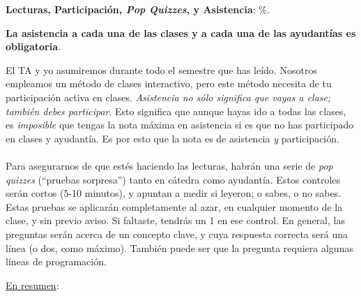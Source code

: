 \documentclass[letterpaper]{article}
\renewenvironment{itemize}{
  \begin{list}{}{
    \setlength{\leftmargin}{1.5em}
  }
}{
  \end{list}
}
\begin{document}
\begin{enumerate}

	\item {\bf Lecturas, Participaci\'on, \emph{Pop Quizzes}, y Asistencia}: {\unskip}\%.
	
	
	\begin{itemize}
		\item[\Pointinghand] {\bf La asistencia a cada una de las clases y a cada una de las ayudant\'ias es obligatoria}.
	\end{itemize}

	El TA y yo asumiremos durante todo el semestre que has le\'ido. Nosotros empleamos un m\'etodo de clases interactivo, pero este m\'etodo necesita de tu participaci\'on activa en clases. \emph{Asistencia no s\'olo significa que vayas a clase; tambi\'en debes participar}. Esto significa que aunque hayas ido a todas las clases, es \emph{imposible} que tengas la nota m\'axima en asistencia si es que no has participado en clases y ayudant\'ia. Es por esto que la nota es de asistencia \emph{y} participaci\'on.
\\
\\	
	Para asegurarnos de que est\'es haciendo las lecturas, habr\'an una serie de \emph{pop quizzes} (``pruebas sorpresa'') tanto en c\'atedra como ayudant\'ia. Estos controles ser\'an cortos (5-10 minutos), y apuntan a medir si leyeron; o sabes, o no sabes. Estas pruebas se aplicar\'an completamente al azar, en cualquier momento de la clase, y sin previo aviso. Si faltaste, tendr\'as un 1 en ese control. En general, las preguntas ser\'an acerca de un concepto clave, y cuya respuesta correcta ser\'a una l\'inea (o dos, como m\'aximo). Tambi\'en puede ser que la pregunta requiera algunas l\'ineas de programaci\'on.





\end{enumerate}


\underline{En resumen}:
\end{document}
